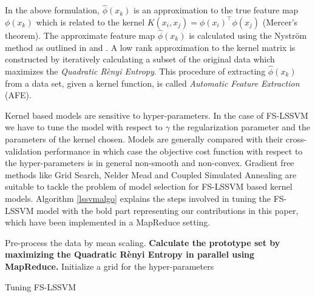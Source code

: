 In the above formulation, $\hat{\phi}(x_k)$ is an approximation to the true feature map $\phi(x_k)$ which is related to the kernel $K(x_i, x_j) = \phi(x_i)^{\intercal} \phi(x_j)$ (Mercer's theorem). The approximate feature map $\hat{\phi}(x_k)$ is calculated using the Nystr\"om method as outlined in \cite{DeBrabanter2010,Mall2015} and \cite{Mall2013}. A low rank approximation to the kernel matrix is constructed by iteratively calculating a subset of the original data which maximizes the \textit{Quadratic R\`enyi Entropy}. This procedure of extracting $\hat{\phi}(x_k)$ from a data set, given a kernel function, is called \textit{Automatic Feature Extraction} (AFE).

Kernel based models are sensitive to hyper-parameters. In the case of FS-LSSVM we have to tune the model with respect to $\gamma$ the regularization parameter and the parameters of the kernel chosen. Models are generally compared with their cross-validation performance in which case the objective cost function with respect to the hyper-parameters is in general non-smooth and non-convex. Gradient free methods like Grid Search, Nelder Mead \cite{Nelder1965} and Coupled Simulated Annealing \cite{Xavier-De-Souza2010} are suitable to tackle the problem of model selection for FS-LSSVM based kernel models. Algorithm \ref{lssvmalgo} explains the steps involved in tuning the FS-LSSVM model with the bold part representing our contributions in this paper, which have been implemented in a MapReduce setting.

\begin{algorithm}[!htbp] \label{lssvmalgo}
\SetAlgoLined
{}
 Pre-process the data by mean scaling.\;
 \textbf{Calculate the prototype set by maximizing the Quadratic R\`enyi Entropy in parallel using MapReduce.}\;
 Initialize a grid for the hyper-parameters\;
 \caption{Tuning FS-LSSVM}
\end{algorithm}
